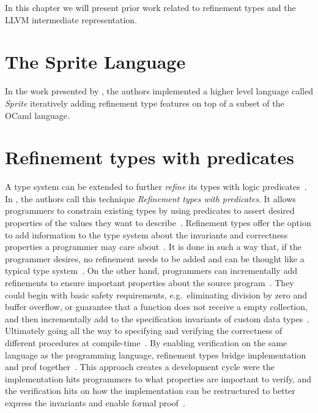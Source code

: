 \documentclass[
  oneside,
  english,
  coorientadorbanca,
  embeddedlogo,
  noabntexcite
]{ufsc-thesis-rn46-2019}
\begin{document}
In this chapter we will present prior work related to refinement types and the LLVM intermediate representation.

\section{The Sprite Language}

In the work presented by \textcite{jhala2020tutorial}, the authors implemented a higher level language called \textit{Sprite} iteratively adding refinement type features on top of a subset of the OCaml language.

\section{Refinement types with predicates}

A type system can be extended to further \textit{refine} its types with logic predicates~\cite{jhala2020tutorial}.
In \textcite{jhala2020tutorial}, the authors call this technique \textit{Refinement types with predicates}.
It allows programmers to constrain existing types by using predicates to assert desired properties of the values they want to describe~\cite{jhala2020tutorial}.
Refinement types offer the option to add information to the type system about the invariants and correctness properties a programmer may care about~\cite{jhala2020tutorial}.
It is done in such a way that, if the programmer desires, no refinement needs to be added and can be thought like a typical type system~\cite{jhala2020tutorial}.
On the other hand, programmers can incrementally add refinements to ensure important properties about the source program~\cite{jhala2020tutorial}.
They could begin with basic safety requirements, e.g.\ eliminating division by zero and buffer overflow, or guarantee that a function does not receive a empty collection, and then incrementally add to the specification invariants of custom data types~\cite{jhala2020tutorial}.
Ultimately going all the way to specifying and verifying the correctness of different procedures at compile-time~\cite{jhala2020tutorial}.
By enabling verification on the same language as the programming language, refinement types bridge implementation and prof together~\cite{jhala2020tutorial}.
This approach creates a development cycle were the implementation hits programmers to what properties are important to verify, and the verification hits on how the implementation can be restructured to better express the invariants and enable formal proof~\cite{jhala2020tutorial}.
\end{document}
